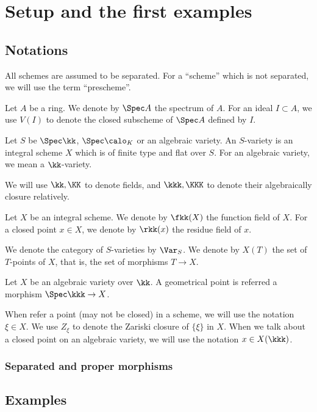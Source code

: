 \section{Setup and the first examples}
\subsection{Notations}

    All schemes are assumed to be separated.
    For a ``scheme'' which is not separated, we will use the term ``prescheme''.

    Let $A$ be a ring.
    We denote by $\Spec A$ the spectrum of $A$.
    For an ideal $I \subset A$, we use $V(I)$ to denote the closed subscheme of $\Spec A$ defined by $I$.
 
    Let $S$ be $\Spec \kk$, $\Spec \calo_K$ or an algebraic variety.
    An $S$-variety is an integral scheme $X$ which is of finite type and flat over $S$.
    For an algebraic variety, we mean a $\kk$-variety.

    We will use $\kk,\KK$ to denote fields, and $\kkk,\KKK$ to denote their algebraically closure relatively.

    Let $X$ be an integral scheme.
    We denote by $\fkk(X)$ the function field of $X$.
    For a closed point $x \in X$, we denote by $\rkk(x)$ the residue field of $x$.

    We denote the category of $S$-varieties by $\Var_S$.
    We denote by $X(T)$ the set of $T$-points of $X$, that is, the set of morphisms $T \to X$.

    Let $X$ be an algebraic variety over $\kk$.
    A geometrical point is referred a morphism $\Spec \kkk \to X$.

    When refer a point (may not be closed) in a scheme, we will use the notation $\xi \in X$.
    We use $Z_\xi$ to denote the Zariski closure of $\{\xi\}$ in $X$.
    When we talk about a closed point on an algebraic variety, we will use the notation $x \in X(\kkk)$.

    \subsubsection{Separated and proper morphisms}


\subsection{Examples}



